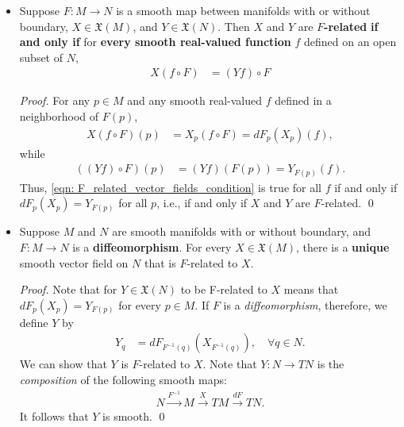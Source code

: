 \documentclass[11pt]{article}
\begin{document}
\begin{itemize}
\item \begin{proposition}
Suppose $F: M \rightarrow N$ is a smooth map between manifolds with or without boundary, $X \in \mathfrak{X}(M)$, and $Y \in \mathfrak{X}(N)$. Then $X$ and $Y$ are \textbf{$F$-related} \textbf{if and only if} for \textbf{every smooth real-valued function} $f$ defined on an open subset of $N$,
\begin{align}
X(f \circ F) &= (Yf) \circ F \label{eqn: F_related_vector_fields_condition}
\end{align}
\end{proposition}
\begin{proof}
For any $p \in M$ and any smooth real-valued $f$ defined in a neighborhood of $F(p)$, 
\begin{align*}
X(f \circ F)(p) &= X_{p}(f \circ F) = dF_{p}(X_{p})(f),
\end{align*} while
\begin{align*}
((Yf) \circ F)(p) &= (Yf)(F(p)) = Y_{F(p)}(f).
\end{align*} Thus, \eqref{eqn: F_related_vector_fields_condition}  is true for all $f$ if and only if $dF_{p}(X_p) = Y_{F(p)}$ for all $p$, i.e., if and
only if $X$ and $Y$ are $F$-related. \qed
\end{proof}

\item 
\begin{proposition}
Suppose $M$ and $N$ are smooth manifolds with or without boundary, and $F: M \rightarrow N$ is a \textbf{diffeomorphism}. For every $X \in \mathfrak{X}(M)$, there is a \textbf{unique} smooth vector field on $N$ that is $F$-related to $X$.
\end{proposition}
\begin{proof}
Note that for  $Y \in \mathfrak{X}(N)$ to be F-related to $X$ means that $dF_{p}(X_p) = Y_{F(p)}$ for every $p \in M$. If $F$ is a \emph{diffeomorphism}, therefore, we define $Y$ by
\begin{align*}
Y_{q} &= dF_{F^{-1}(q)}(X_{F^{-1}(q)}),\quad \forall q\in N.
\end{align*} We can show that $Y$ is  $F$-related to $X$. Note that $Y: N \rightarrow TN$ is the \emph{composition} of the following smooth maps:
\begin{align*}
N \stackrel{F^{-1}}{\longrightarrow} M \stackrel{X}{\longrightarrow} TM \stackrel{dF}{\longrightarrow} TN.
\end{align*} It follows that $Y$ is smooth. \qed
\end{proof}



\end{itemize}
\end{document}
